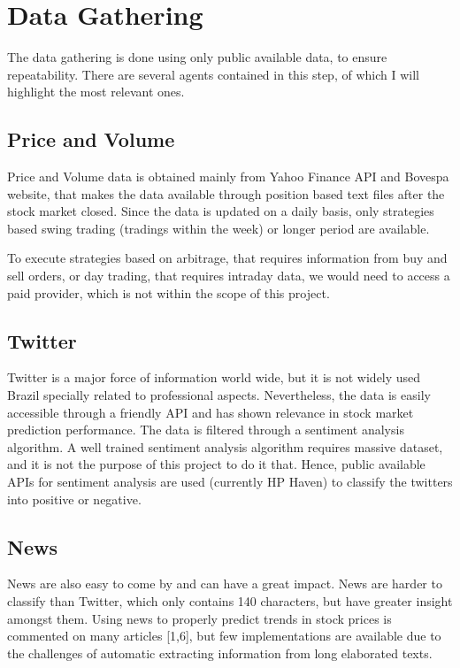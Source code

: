 \documentclass[prodmode,acmtecs]{acmsmall} %
\begin{document}
\section {Data Gathering} 

The data gathering is done using only public available data, to ensure repeatability. There are several agents contained in this step, of which I will highlight the most relevant ones.

\subsection {Price and Volume} 

Price and Volume data is obtained mainly from Yahoo Finance API and Bovespa website, that makes the data available through position based text files after the stock market closed. Since the data is updated on a daily basis, only strategies based swing trading (tradings within the week) or longer period are available. 

To execute strategies based on arbitrage, that requires information from buy and sell orders, or day trading, that requires intraday data, we would need to access a paid provider, which is not within the scope of this project.

\subsection {Twitter}

Twitter is a major force of information world wide, but it is not widely used Brazil specially related to professional aspects. Nevertheless, the data is easily accessible through a friendly API and has shown relevance in stock market prediction performance. The data is filtered through a sentiment analysis algorithm. A well trained sentiment analysis algorithm requires massive dataset, and it is not the purpose of this project to do it that. Hence, public available APIs for sentiment analysis are used (currently HP Haven) to classify the twitters into positive or negative.

\subsection {News}

News are also easy to come by and can have a great impact. News are harder to classify than Twitter, which only contains 140 characters, but have greater insight amongst them. Using news to properly predict trends in stock prices is commented on many articles [1,6], but few implementations are available due to the challenges of automatic extracting information from long elaborated texts. 
\end{document}
